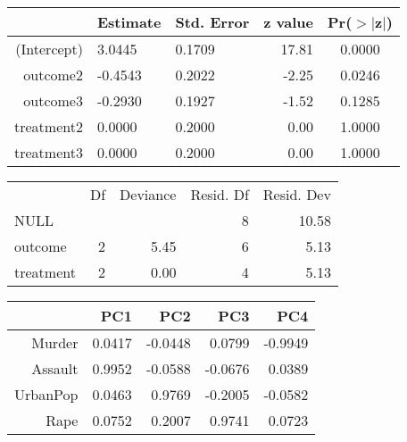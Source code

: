 \begin{table}[ht]
\begin{center}
\begin{tabular}{|r||llrc|}
  \hline
 & Estimate & Std. Error & z value & Pr($>$$|$z$|$) \\ 
  \hline
(Intercept) & 3.0445 & 0.1709 & 17.81 & 0.0000 \\ 
  outcome2 & -0.4543 & 0.2022 & -2.25 & 0.0246 \\ 
  outcome3 & -0.2930 & 0.1927 & -1.52 & 0.1285 \\ 
  treatment2 & 0.0000 & 0.2000 & 0.00 & 1.0000 \\ 
  treatment3 & 0.0000 & 0.2000 & 0.00 & 1.0000 \\ 
   \hline
\end{tabular}
\end{center}
\end{table}
\begin{table}[ht]
\begin{center}
{\small
\begin{tabular}{lrrrr}
  & Df & Deviance & Resid. Df & Resid. Dev \\ 
 NULL &  &  & 8 & 10.58 \\ 
   \hline
outcome & 2 & 5.45 & 6 & 5.13 \\ 
  treatment & 2 & 0.00 & 4 & 5.13 \\ 
  \end{tabular}
}
\end{center}
\end{table}
\begin{table}[ht]
\begin{center}
\begin{tabular}{rrrrr}
  \hline
 & PC1 & PC2 & PC3 & PC4 \\ 
  \hline
Murder & 0.0417 & -0.0448 & 0.0799 & -0.9949 \\ 
  Assault & 0.9952 & -0.0588 & -0.0676 & 0.0389 \\ 
  UrbanPop & 0.0463 & 0.9769 & -0.2005 & -0.0582 \\ 
  Rape & 0.0752 & 0.2007 & 0.9741 & 0.0723 \\ 
   \hline
\end{tabular}
\end{center}
\end{table}
